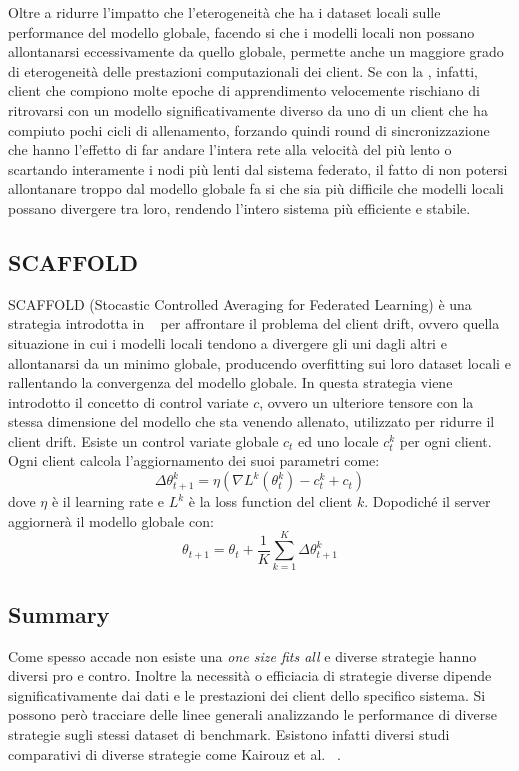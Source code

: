 Oltre a ridurre l'impatto che l'eterogeneità che ha i dataset locali 
sulle performance del modello globale, facendo si che i modelli locali 
non possano allontanarsi eccessivamente da quello globale, permette 
anche un maggiore grado di eterogeneità delle prestazioni computazionali 
dei client. Se con la , infatti, client che compiono 
molte epoche di apprendimento velocemente rischiano di ritrovarsi con un 
modello significativamente diverso da uno di un client che ha compiuto
pochi cicli di allenamento, forzando quindi round di sincronizzazione
che hanno l'effetto di far andare l'intera rete alla velocità del più
lento o scartando interamente i nodi più lenti dal sistema federato, 
il fatto di non potersi allontanare troppo dal modello globale fa si
che sia più difficile che modelli locali possano divergere tra loro,
rendendo l'intero sistema più efficiente e stabile.


\subsection{SCAFFOLD}
SCAFFOLD (Stocastic Controlled Averaging for Federated Learning) è una 
strategia introdotta in ~\cite{Karimireddy2020scaffold} per 
affrontare il problema del client drift, ovvero quella situazione in 
cui i modelli locali tendono a divergere gli uni dagli altri e allontanarsi 
da un minimo globale, producendo overfitting sui loro dataset locali 
e rallentando la convergenza del modello globale.
In questa strategia viene introdotto il concetto di control variate
\(c\), ovvero un ulteriore tensore con la stessa dimensione del modello 
che sta venendo allenato, utilizzato per ridurre il client drift. 
Esiste un control variate globale \(c_t\) ed uno locale \(c_t^k\) per 
ogni client. Ogni client calcola l'aggiornamento dei suoi parametri come:
\[
\Delta\theta_{t+1}^k = \eta (\nabla L^k(\theta_t^k) -c_t^k +c_t)
\]
dove \(\eta\) è il learning rate e \(L^k\) è la loss function del 
client \(k\). Dopodiché il server aggiornerà il modello globale con:
\[
\theta_{t+1} = \theta_t + \frac{1}{K} \sum_{k=1}^{K} \Delta\theta_{t+1}^k
\]

\subsection{Summary}
Come spesso accade non esiste una \textit{one size fits all} e diverse 
strategie hanno diversi pro e contro. Inoltre la necessità o efficiacia 
di strategie diverse dipende significativamente dai dati e le prestazioni 
dei client dello specifico sistema. Si possono però tracciare delle 
linee generali analizzando le performance di diverse strategie sugli 
stessi dataset di benchmark. Esistono infatti diversi studi comparativi 
di diverse strategie come Kairouz et al.  ~\cite{kairouz2021flOpenProblems}.


